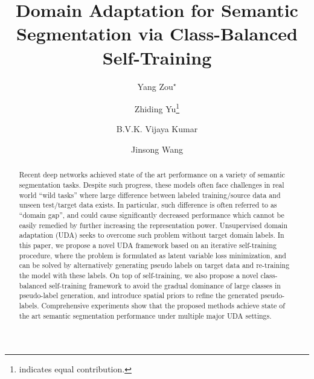 \documentclass[runningheads]{llncs}
\begin{document}
\title{Domain Adaptation for Semantic Segmentation via Class-Balanced Self-Training}

\author{
Yang Zou$^{\star}$\and 
Zhiding Yu\thanks{indicates equal contribution.} \and
B.V.K. Vijaya Kumar \and 
Jinsong Wang
}



\maketitle
\begin{abstract}
Recent deep networks achieved state of the art performance on a variety of semantic segmentation tasks. Despite such progress, these models often face challenges in real world ``wild tasks'' where large difference between labeled training/source data and unseen test/target data exists. In particular, such difference is often referred to as ``domain gap'', and could cause significantly decreased performance which cannot be easily remedied by further increasing the representation power. Unsupervised domain adaptation (UDA) seeks to overcome such problem without target domain labels. In this paper, we propose a novel UDA framework based on an iterative self-training procedure, where the problem is formulated as latent variable loss minimization, and can be solved by alternatively generating pseudo labels on target data and re-training the model with these labels. On top of self-training, we also propose a novel class-balanced self-training framework to avoid the gradual dominance of large classes in pseudo-label generation, and introduce spatial priors to refine the generated pseudo-labels. Comprehensive experiments show that the proposed methods achieve state of the art semantic segmentation performance under multiple major UDA settings.
\end{abstract}
\end{document}
